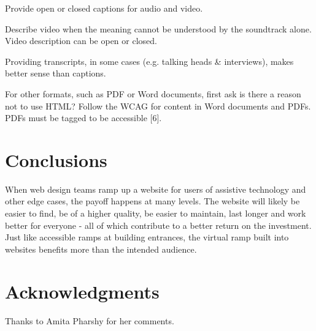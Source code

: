 \documentclass{acm_proc_article-sp}
\begin{document}
Provide open or closed captions for audio and video.

Describe video when the meaning cannot be understood by the soundtrack alone. Video description can be open or closed.

Providing transcripts, in some cases (e.g. talking heads \& interviews), makes better sense than captions.

For other formats, such as PDF or Word documents, first ask is there a reason not to use HTML? Follow the WCAG for content in Word documents and PDFs. PDFs must be tagged to be accessible [6].

\section{Conclusions}
When web design teams ramp up a website for users of assistive technology and other edge cases, the payoff happens at many levels. The website will likely be easier to find, be of a higher quality, be easier to maintain, last longer and work better for everyone - all of which contribute to a better return on the investment. Just like accessible ramps at building entrances, the virtual ramp built into websites benefits more than the intended audience.

\section{Acknowledgments}
Thanks to Amita Pharshy for her comments.

\end{document}
